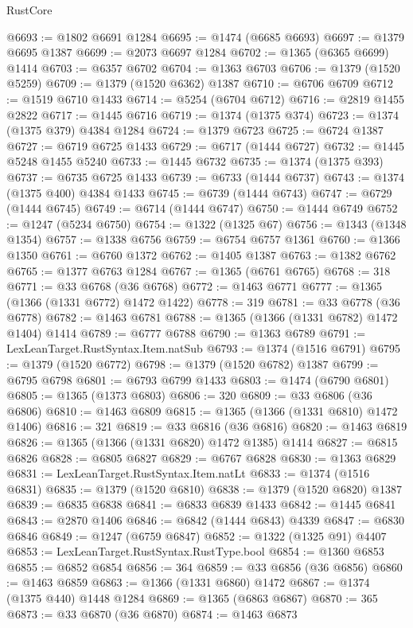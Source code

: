 \begin{lexlean}{RustCore}
\begin{coremodule}
@6693 := @1802 @6691 @1284
@6695 := @1474 (@6685 @6693)
@6697 := @1379 @6695 @1387
@6699 := @2073 @6697 @1284
@6702 := @1365 (@6365 @6699) @1414
@6703 := @6357 @6702
@6704 := @1363 @6703
@6706 := @1379 (@1520 @5259)
@6709 := @1379 (@1520 @6362) @1387
@6710 := @6706 @6709
@6712 := @1519 @6710 @1433
@6714 := @5254 (@6704 @6712)
@6716 := @2819 @1455 @2822
@6717 := @1445 @6716
@6719 := @1374 (@1375 @374)
@6723 := @1374 (@1375 @379) @4384 @1284
@6724 := @1379 @6723
@6725 := @6724 @1387
@6727 := @6719 @6725 @1433
@6729 := @6717 (@1444 @6727)
@6732 := @1445 @5248 @1455 @5240
@6733 := @1445 @6732
@6735 := @1374 (@1375 @393)
@6737 := @6735 @6725 @1433
@6739 := @6733 (@1444 @6737)
@6743 := @1374 (@1375 @400) @4384 @1433
@6745 := @6739 (@1444 @6743)
@6747 := @6729 (@1444 @6745)
@6749 := @6714 (@1444 @6747)
@6750 := @1444 @6749
@6752 := @1247 (@5234 @6750)
@6754 := @1322 (@1325 @67)
@6756 := @1343 (@1348 @1354)
@6757 := @1338 @6756
@6759 := @6754 @6757 @1361
@6760 := @1366 @1350
@6761 := @6760 @1372
@6762 := @1405 @1387
@6763 := @1382 @6762
@6765 := @1377 @6763 @1284
@6767 := @1365 (@6761 @6765)
@6768 := 318
@6771 := @33 @6768 (@36 @6768)
@6772 := @1463 @6771
@6777 := @1365 (@1366 (@1331 @6772) @1472 @1422)
@6778 := 319
@6781 := @33 @6778 (@36 @6778)
@6782 := @1463 @6781
@6788 := @1365 (@1366 (@1331 @6782) @1472 @1404) @1414
@6789 := @6777 @6788
@6790 := @1363 @6789
@6791 := LexLeanTarget.RustSyntax.Item.natSub
@6793 := @1374 (@1516 @6791)
@6795 := @1379 (@1520 @6772)
@6798 := @1379 (@1520 @6782) @1387
@6799 := @6795 @6798
@6801 := @6793 @6799 @1433
@6803 := @1474 (@6790 @6801)
@6805 := @1365 (@1373 @6803)
@6806 := 320
@6809 := @33 @6806 (@36 @6806)
@6810 := @1463 @6809
@6815 := @1365 (@1366 (@1331 @6810) @1472 @1406)
@6816 := 321
@6819 := @33 @6816 (@36 @6816)
@6820 := @1463 @6819
@6826 := @1365 (@1366 (@1331 @6820) @1472 @1385) @1414
@6827 := @6815 @6826
@6828 := @6805 @6827
@6829 := @6767 @6828
@6830 := @1363 @6829
@6831 := LexLeanTarget.RustSyntax.Item.natLt
@6833 := @1374 (@1516 @6831)
@6835 := @1379 (@1520 @6810)
@6838 := @1379 (@1520 @6820) @1387
@6839 := @6835 @6838
@6841 := @6833 @6839 @1433
@6842 := @1445 @6841
@6843 := @2870 @1406
@6846 := @6842 (@1444 @6843) @4339
@6847 := @6830 @6846
@6849 := @1247 (@6759 @6847)
@6852 := @1322 (@1325 @91) @4407
@6853 := LexLeanTarget.RustSyntax.RustType.bool
@6854 := @1360 @6853
@6855 := @6852 @6854
@6856 := 364
@6859 := @33 @6856 (@36 @6856)
@6860 := @1463 @6859
@6863 := @1366 (@1331 @6860) @1472
@6867 := @1374 (@1375 @440) @1448 @1284
@6869 := @1365 (@6863 @6867)
@6870 := 365
@6873 := @33 @6870 (@36 @6870)
@6874 := @1463 @6873

\end{coremodule}
\end{lexlean}
